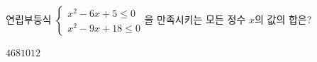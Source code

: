 연립부등식 $\begin{cases} x^2-6x+5\le 0 \\ x^2-9x+18\le 0 \end{cases}$을 만족시키는 모든 정수 $x$의 값의 합은?
\begin{choices32}{$4$}{$6$}{$8$}{$10$}{$12$}\end{choices32}

